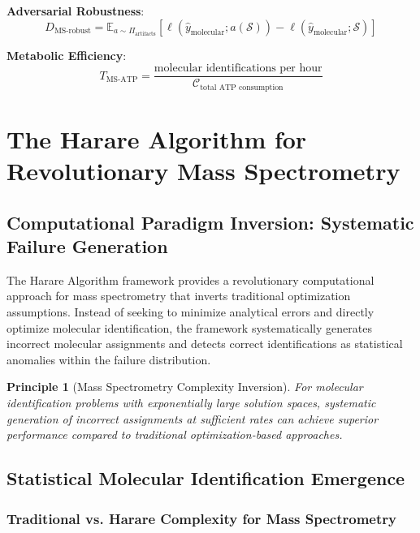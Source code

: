 \documentclass[11pt,a4paper]{article}
\newtheorem{principle}[theorem]{Principle}
\theoremstyle{remark}
\begin{document}
\textbf{Adversarial Robustness}:
\begin{equation}
D_{\text{MS-robust}} = \mathbb{E}_{a \sim \Pi_{\text{artifacts}}}\left[\ell(\hat{y}_{\text{molecular}}; a(\mathcal{S})) - \ell(\hat{y}_{\text{molecular}}; \mathcal{S})\right]
\end{equation}

\textbf{Metabolic Efficiency}:
\begin{equation}
T_{\text{MS-ATP}} = \frac{\text{molecular identifications per hour}}{\mathcal{C}_{\text{total ATP consumption}}}
\end{equation}

\section{The Harare Algorithm for Revolutionary Mass Spectrometry}

\subsection{Computational Paradigm Inversion: Systematic Failure Generation}

The Harare Algorithm framework provides a revolutionary computational approach for mass spectrometry that inverts traditional optimization assumptions. Instead of seeking to minimize analytical errors and directly optimize molecular identification, the framework systematically generates incorrect molecular assignments and detects correct identifications as statistical anomalies within the failure distribution.

\begin{principle}[Mass Spectrometry Complexity Inversion]
For molecular identification problems with exponentially large solution spaces, systematic generation of incorrect assignments at sufficient rates can achieve superior performance compared to traditional optimization-based approaches.
\end{principle}

\subsection{Statistical Molecular Identification Emergence}

\subsubsection{Traditional vs. Harare Complexity for Mass Spectrometry}
\end{document}
